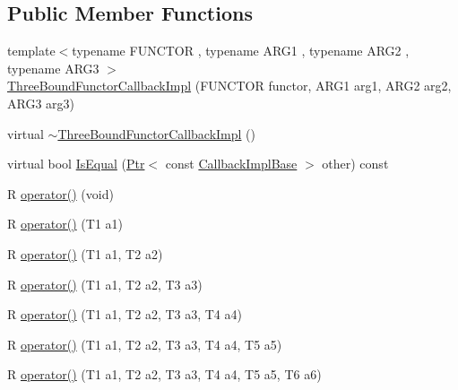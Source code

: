 \subsection*{Public Member Functions}
\begin{DoxyCompactItemize}
\item 
{\footnotesize template$<$typename F\+U\+N\+C\+T\+OR , typename A\+R\+G1 , typename A\+R\+G2 , typename A\+R\+G3 $>$ }\\\hyperlink{classns3_1_1ThreeBoundFunctorCallbackImpl_ade1ba42052c9505f2ae778aac9e7364e}{Three\+Bound\+Functor\+Callback\+Impl} (F\+U\+N\+C\+T\+OR functor, A\+R\+G1 arg1, A\+R\+G2 arg2, A\+R\+G3 arg3)
\item 
virtual \hyperlink{classns3_1_1ThreeBoundFunctorCallbackImpl_a26703e4e5a5b0a50dde473d4615d4171}{$\sim$\+Three\+Bound\+Functor\+Callback\+Impl} ()
\item 
virtual bool \hyperlink{classns3_1_1ThreeBoundFunctorCallbackImpl_acbe597cb914429ca4427c4de14d0dbca}{Is\+Equal} (\hyperlink{classns3_1_1Ptr}{Ptr}$<$ const \hyperlink{classns3_1_1CallbackImplBase}{Callback\+Impl\+Base} $>$ other) const 
\end{DoxyCompactItemize}
{\bf }\par
\begin{DoxyCompactItemize}
\item 
R \hyperlink{classns3_1_1ThreeBoundFunctorCallbackImpl_a46cdd6ae490e10dc3cb3c416664dd3bb}{operator()} (void)
\item 
R \hyperlink{classns3_1_1ThreeBoundFunctorCallbackImpl_a6d8e14102f06c4bb62e9a832f837f253}{operator()} (T1 a1)
\item 
R \hyperlink{classns3_1_1ThreeBoundFunctorCallbackImpl_ad86b09d74df2d7e0b4f0324bd4bcbd9b}{operator()} (T1 a1, T2 a2)
\item 
R \hyperlink{classns3_1_1ThreeBoundFunctorCallbackImpl_a0cd963f7ff46e1657ffe6b035214ae20}{operator()} (T1 a1, T2 a2, T3 a3)
\item 
R \hyperlink{classns3_1_1ThreeBoundFunctorCallbackImpl_aaf4cbef57f7815417e05f9c6a55ffd3f}{operator()} (T1 a1, T2 a2, T3 a3, T4 a4)
\item 
R \hyperlink{classns3_1_1ThreeBoundFunctorCallbackImpl_a3ad836cdc80c08922b6c66c7828e2b1d}{operator()} (T1 a1, T2 a2, T3 a3, T4 a4, T5 a5)
\item 
R \hyperlink{classns3_1_1ThreeBoundFunctorCallbackImpl_aaa6f274360cd1c2ebed1117b27566d64}{operator()} (T1 a1, T2 a2, T3 a3, T4 a4, T5 a5, T6 a6)
\end{DoxyCompactItemize}

